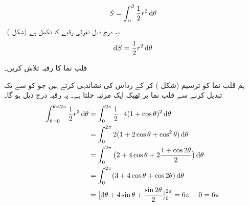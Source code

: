 \\
\begin{align*}
S=\int_{\alpha}^{\beta}\frac{1}{2}r^2\dif\theta
\end{align*}
یہ درج ذیل تفرقی رقبے کا تکمل ہے (شکل )۔
\begin{align*}
\dif S=\frac{1}{2}r^2\dif\theta
\end{align*}

قلب نما  کا رقبہ تلاش کریں۔

ہم قلب نما کو ترسیم (شکل ) کر کے رداس   کی نشاندہی کرتے ہیں جو  کو    سے   تک تبدیل  کرنے  سے  قلب نما پر ٹھیک ایک مرتبہ چلتا ہے۔ یہ رقبہ درج ذیل ہو گا۔
\begin{align*}
\int_{\theta=0}^{\theta=2\pi}\frac{1}{2}r^2\dif\theta&=\int_{0}^{2\pi}\frac{1}{2}\cdot 4(1+\cos\theta)^2\dif \theta\\
&=\int_0^{2\pi}2(1+2\cos\theta+\cos^2\theta)\dif \theta\\
&=\int_0^{2\pi}\big(2+4\cos\theta+2\frac{1+\cos2\theta}{2}\big)\dif\theta\\
&=\int_0^{2\pi}(3+4\cos\theta+\cos2\theta)\dif\theta\\
&=\big[3\theta+4\sin\theta+\frac{\sin2\theta}{2}\big]_0^{2\pi}=6\pi-0=6\pi
\end{align*}
